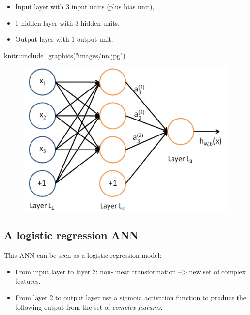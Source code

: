 \documentclass[
  letterpaper,
  DIV=11,
  numbers=noendperiod]{scrartcl}
\newenvironment{Shaded}{\begin{snugshade}}{\end{snugshade}}
\newcommand{\FunctionTok}[1]{\textcolor[rgb]{0.28,0.35,0.67}{#1}}
\newcommand{\NormalTok}[1]{\textcolor[rgb]{0.00,0.23,0.31}{#1}}
\newcommand{\SpecialCharTok}[1]{\textcolor[rgb]{0.37,0.37,0.37}{#1}}
\newcommand{\StringTok}[1]{\textcolor[rgb]{0.13,0.47,0.30}{#1}}
\providecommand{\tightlist}{%
  \setlength{\itemsep}{0pt}\setlength{\parskip}{0pt}}\usepackage{longtable,booktabs,array}
\begin{document}
\begin{itemize}
\tightlist
\item
  Input layer with 3 input units (plus bias unit),
\item
  1 hidden layer with 3 hidden units,
\item
  Output layer with 1 output unit.
\end{itemize}

\begin{Shaded}
\begin{Highlighting}[]
\NormalTok{knitr}\SpecialCharTok{::}\FunctionTok{include\_graphics}\NormalTok{(}\StringTok{"images/nn.jpg"}\NormalTok{)}
\end{Highlighting}
\end{Shaded}

\begin{figure}[H]

{\centering \includegraphics[width=1\textwidth,height=\textheight]{images/nn.jpg}

}

\end{figure}

\hypertarget{a-logistic-regression-ann}{%
\subsection{A logistic regression ANN}\label{a-logistic-regression-ann}}

This ANN can be seen as a logistic regression model:

\begin{itemize}
\item
  From input layer to layer 2: non-linear transformation
  --\textgreater{} new set of complex features.
\item
  From layer 2 to output layer use a sigmoid activation function to
  produce the following output from the set of \emph{complex features}.
\end{itemize}
\end{document}
